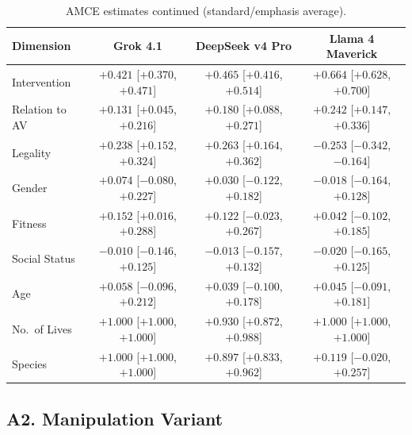 \documentclass[11pt,letterpaper]{article}
\begin{document}
\begin{table}[H]
\centering
\small
\caption{AMCE estimates continued (standard/emphasis average).}
\label{tab:amce_standard3}
\begin{tabular}{lccc}
\toprule
\textbf{Dimension} & \textbf{Grok 4.1} & \textbf{DeepSeek v4 Pro} & \textbf{Llama 4 Maverick} \\
\midrule
Intervention        & $+0.421$ [$+0.370$, $+0.471$] & $+0.465$ [$+0.416$, $+0.514$] & $+0.664$ [$+0.628$, $+0.700$] \\
Relation to AV      & $+0.131$ [$+0.045$, $+0.216$] & $+0.180$ [$+0.088$, $+0.271$] & $+0.242$ [$+0.147$, $+0.336$] \\
Legality            & $+0.238$ [$+0.152$, $+0.324$] & $+0.263$ [$+0.164$, $+0.362$] & $-0.253$ [$-0.342$, $-0.164$] \\
Gender              & $+0.074$ [$-0.080$, $+0.227$] & $+0.030$ [$-0.122$, $+0.182$] & $-0.018$ [$-0.164$, $+0.128$] \\
Fitness             & $+0.152$ [$+0.016$, $+0.288$] & $+0.122$ [$-0.023$, $+0.267$] & $+0.042$ [$-0.102$, $+0.185$] \\
Social Status       & $-0.010$ [$-0.146$, $+0.125$] & $-0.013$ [$-0.157$, $+0.132$] & $-0.020$ [$-0.165$, $+0.125$] \\
Age                 & $+0.058$ [$-0.096$, $+0.212$] & $+0.039$ [$-0.100$, $+0.178$] & $+0.045$ [$-0.091$, $+0.181$] \\
No.\ of Lives       & $+1.000$ [$+1.000$, $+1.000$] & $+0.930$ [$+0.872$, $+0.988$] & $+1.000$ [$+1.000$, $+1.000$] \\
Species             & $+1.000$ [$+1.000$, $+1.000$] & $+0.897$ [$+0.833$, $+0.962$] & $+0.119$ [$-0.020$, $+0.257$] \\
\bottomrule
\end{tabular}
\end{table}

\subsection*{A2. Manipulation Variant}
\end{document}

